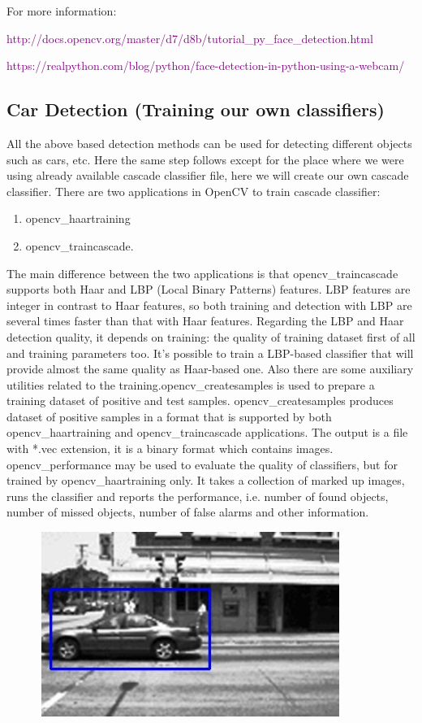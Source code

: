 \documentclass[a4paper,12pt]{article}
\begin{document}
For more information:

\textcolor{purple}{http://docs.opencv.org/master/d7/d8b/tutorial\_py\_face\_detection.html}

\textcolor{purple}{https://realpython.com/blog/python/face-detection-in-python-using-a-webcam/}

\subsection{Car Detection (Training our own classifiers)}

  All the above based detection methods can be used for detecting different objects such as cars, etc. Here the same step follows 
except for the place where we were using already available cascade classifier file, here we will create our own cascade classifier.
There are two applications in OpenCV to train cascade classifier: 

\begin{enumerate}
	\item 	opencv\_haartraining 
	\item 	opencv\_traincascade.
\end{enumerate}

The main difference between the two applications is that opencv\_traincascade supports both Haar and LBP (Local Binary Patterns) 
features. LBP features are integer in contrast to Haar features, so both training and detection with LBP are several times faster 
than that with Haar features. Regarding the LBP and Haar detection quality, it depends on training: the quality of training dataset 
first of all and training parameters too. It’s possible to train a LBP-based classifier that will provide almost the same quality as 
Haar-based one. Also there are some auxiliary utilities related to the training.opencv\_createsamples is used to prepare a training 
dataset of positive and test samples. opencv\_createsamples produces dataset of positive samples in a format that is supported by both 
opencv\_haartraining and opencv\_traincascade applications. The output is a file with *.vec extension, it is a binary format which 
contains images. opencv\_performance may be used to evaluate the quality of classifiers, but for trained by opencv\_haartraining only. 
It takes a collection of marked up images, runs the classifier and reports the performance, i.e. number of found objects, number of
missed objects, number of false 
alarms and other information.

\begin{center}
	\graphicspath{ {images/} }
	\includegraphics[width=12cm, height=6cm]{car}
\end{center}
\end{document}
